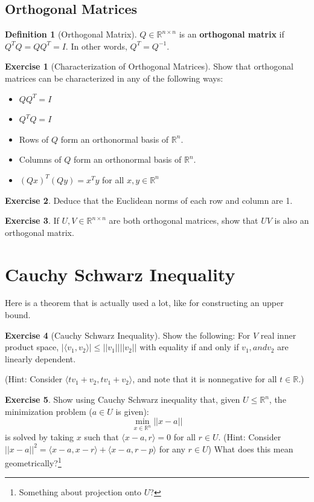 \documentclass[12pt, a4paper]{article}
\newcommand{\R}{\mathbb{R}}
\newcommand{\inner}[1]{\langle #1 \rangle}
\newcommand{\norm}[1]{\lvert \lvert #1 \rvert \rvert}
\theoremstyle{remark}
\theoremstyle{definition}
\newtheorem{definition}{Definition}
\newtheorem{exercise}{Exercise}
\numberwithin{equation}{section}
\numberwithin{definition}{section}
\numberwithin{example}{section}
\numberwithin{exercise}{section}
\numberwithin{remark}{section}
\numberwithin{figure}{section}
\begin{document}
\subsection{Orthogonal Matrices}
\begin{definition}[Orthogonal Matrix]
    $Q \in \R^{n \times n}$ is an \textbf{orthogonal matrix} if $Q^T Q = Q Q^T = I$.
    In other words, $Q^T = Q^{-1}$.
\end{definition}
\begin{exercise}[Characterization of Orthogonal Matrices]
    Show that orthogonal matrices can be characterized in any of the following ways:
    \begin{itemize}
        \item $Q Q^T = I$
        \item $Q^T Q = I$
        \item Rows of $Q$ form an orthonormal basis of $\R^n$.
        \item Columns of $Q$ form an orthonormal basis of $\R^n$.
        \item $\left( Q x \right)^T \left( Q y \right) = x^T y$ for all $x, y \in \R^n$
    \end{itemize}
\end{exercise}
\begin{exercise}
    Deduce that the Euclidean norms of each row and column are 1.
\end{exercise}
\begin{exercise}
    If $U,V \in \R^{n \times n}$ are both orthogonal matrices, show that $UV$ is also an orthogonal matrix.
\end{exercise}

\section{Cauchy Schwarz Inequality}
Here is a theorem that is actually used a lot, like for constructing an upper bound.
\begin{exercise}[Cauchy Schwarz Inequality]
    Show the following:
    For $V$ real inner product space, $|\inner{v_1, v_2}| \leq \norm{v_1} \norm{v_2}$
    with equality if and only if $v_1, and v_2$ are linearly dependent.
    
    (Hint: Consider $\inner{tv_1 + v_2, tv_1 + v_2}$, and note that it is nonnegative for all $t \in \R$.)
\end{exercise}
\begin{exercise}
    Show using Cauchy Schwarz inequality that,
    given $U \leq \R^n$,
    the minimization problem ($a \in U$ is given):
    \begin{equation*}
        \min_{x \in \R^n} \norm{x - a}
    \end{equation*}
    is solved by taking $x$ such that $\inner{x - a, r} = 0$ for all $r \in U$.
    (Hint: Consider $\norm{x-a}^2 = \inner{x - a, x-r} + \inner{x-a, r-p}$ for any $r \in U$)
    What does this mean geometrically?\footnote{Something about projection onto $U$?}
\end{exercise}
\end{document}
